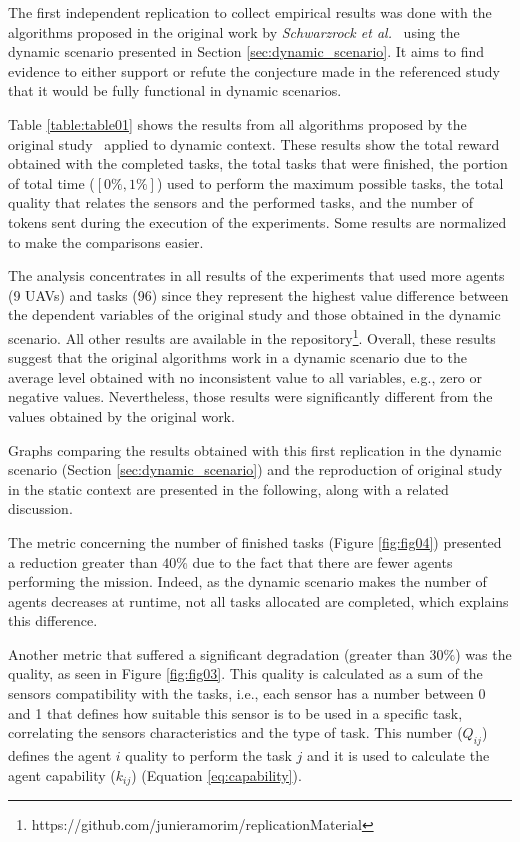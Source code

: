 
The first independent replication to collect empirical results was done with the algorithms proposed in the original work by \textit{Schwarzrock et al.}~\citep{MAS07} using the dynamic scenario presented in Section \ref{sec:dynamic_scenario}. It aims to find evidence to either support or refute the conjecture made in the referenced study that it would be fully functional in dynamic scenarios. 

Table \ref{table:table01} shows the results from all algorithms proposed by the original study~\citep{MAS07} applied to dynamic context. These results show the total reward obtained with the completed tasks, the total tasks that were finished, the portion of total time ($[0\%,1\%]$) used to perform the maximum possible tasks, the total quality that relates the sensors and the performed tasks, and the number of tokens sent during the execution of the experiments. Some results are normalized to make the comparisons easier. 



The analysis concentrates in all results of the experiments that used more agents (9 UAVs) and tasks (96) since they represent the highest value difference between the dependent variables of the original study and those obtained in the dynamic scenario. All other results are available in the repository\footnote{https://github.com/junieramorim/replicationMaterial}. Overall, these results suggest that the original algorithms work in a dynamic scenario due to the average level obtained with no inconsistent value to all variables, e.g., zero or negative values. Nevertheless, those results were significantly different from the values obtained by the original work.

Graphs comparing the results obtained with this first replication in the dynamic scenario (Section \ref{sec:dynamic_scenario}) and the reproduction of original study in the static context are presented in the following, along with a related discussion.

The metric concerning the number of finished tasks (Figure \ref{fig:fig04}) presented a reduction greater than $40\%$ due to the fact that there are fewer agents performing the mission. Indeed, as the dynamic scenario makes the number of agents decreases at runtime, not all tasks allocated are completed, which explains this difference. 

Another metric that suffered a significant degradation (greater than $30\%$) was the quality, as seen in Figure \ref{fig:fig03}. This quality is calculated as a sum of the sensors compatibility with the tasks, i.e., each sensor has a number between 0 and 1 that defines how suitable this sensor is to be used in a specific task, correlating the sensors characteristics and the type of task. This number ($Q_{ij}$) defines the agent $i$ quality to perform the task $j$ and it is used to calculate the agent capability ($k_{ij}$) (Equation \ref{eq:capability}).

